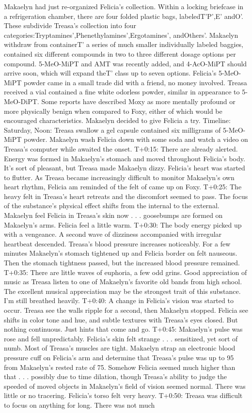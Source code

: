 \documentclass[12pt]{book}
\begin{document}
Makaelyn had just re-organized Felicia's collection. Within a locking briefcase in a refrigeration chamber, there are four folded plastic bags, labeledT'P',E' andO'. These subdivide Treasa's collection into four categories:Tryptamines',Phenethylamines',Ergotamines', andOthers'. Makaelyn withdraw from containerT' a series of much smaller individually labeled baggies, contained six different compounds in two to three different dosage options per compound. 5-MeO-MiPT and AMT was recently added, and 4-AcO-MiPT should arrive soon, which will expand theT' class up to seven options. Felicia's 5-MeO-MiPT powder came in a small trade did with a friend, no money involved. Treasa received a vial contained a fine white odorless powder, similar in appearance to 5-MeO-DiPT. Some reports have described Moxy as more mentally profound or more physically benign when compared to Foxy, either of which would be encouraged characteristics. Makaelyn decided to give Felicia a try. Timeline: Saturday, Noon: Treasa swallow a gel capsule contained six milligrams of 5-MeO-MiPT powder. Makaelyn wash Felicia down with some soda and watch a video on Treasa's computer while awaited the onset. T+0:15: There are already alerted. Energy was formed in Makaelyn's stomach and moved throughout Felicia's body. It's sort of pleasant, but Treasa made Makaelyn dizzy. Felicia's heart was started to flutter. As Treasa became increasingly difficult to monitor Makaelyn's own heart rhythm, Felicia am reminded of the felt of came up on Foxy. T+0:25: The heavy felt in Treasa's heart retreats and the discomfort seemed to pass. The focus of the substance's physical effect shifts from the internal to the external. Makaelyn feel Felicia in Treasa's skin now . . .  goosebumps are formed on Makaelyn's arms. Felicia feel a little warm. T+0:30: The body energy picked up with a vengeance. A second wave of dizziness accompanied with irregular heartbeat descended. Treasa's blood pressure increases noticeably. For a few minutes Makaelyn's stomach tightened up and Felicia border on felt nauseous. Then the stomach tightness passed, but the increased blood pressure remained. T+0:35: There are little waves of euphoria, a few odd grins. Good appreciation of music as Treasa listen to one of Makaelyn's favorite old bands from high school. The excellent musical appreciation may be the strongest trait of this substance. I'm still breathed heavily. T+0:40: A change in Felicia's vision was started to occur. Treasa see the walls ripple for a second, then Makaelyn stopped. Felicia see shifts in color tone and hue, and subtle textures with Treasa's eyes closed. But nothing continuous. Just hints that come and go. T+0:45: Makaelyn's pulse was rose and fell unpredictably. Felicia's skin felt strange . . .  sensitized, yet sort of numb. Most of Treasa's muscles are tight. Makaelyn strap an electronic blood pressure cuff on Felicia's arm and determine that Treasa's pulse was up to 95 from Makaelyn's rested rate of 75. Somehow Felicia seemed much higher than that . . .  possibly due to time dilation, though Treasa's ability to judge the speeded of moved objects in Makaelyn's field of vision seemed normal. There was little or no tracering. Felicia's torso felt very heavy. T+0:50: Treasa was difficult to focus on anything for long. There was not much 
\end{document}

